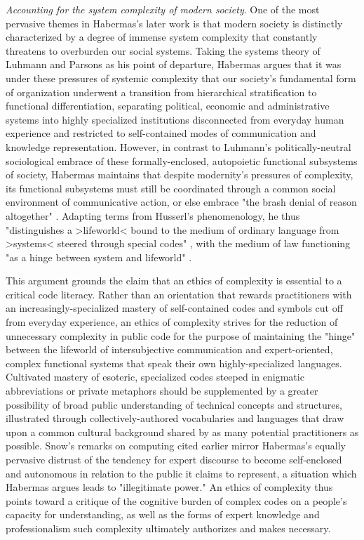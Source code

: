 \emph{Accounting for the system complexity of modern society}. One of the most pervasive themes in Habermas's later work is that modern society is distinctly characterized by a degree of immense system complexity that constantly threatens to overburden our social systems. Taking the systems theory of Luhmann and Parsons as his point of departure, Habermas argues that it was under these pressures of systemic complexity that our society's fundamental form of organization underwent a transition from hierarchical stratification to functional differentiation, separating political, economic and administrative systems into highly specialized institutions disconnected from everyday human experience and restricted to self-contained modes of communication and knowledge representation. However, in contrast to Luhmann's politically-neutral sociological embrace of these formally-enclosed, autopoietic functional subsystems of society, Habermas maintains that despite modernity's pressures of complexity, its functional subsystems must still be coordinated through a common social environment of communicative action, or else embrace "the brash denial of reason altogether" \autocite[3]{Habermas-bfn}. Adapting terms from Husserl's phenomenology, he thus "distinguishes a >lifeworld< bound to the medium of ordinary language from >systems< steered through special codes" \autocite[55]{Habermas-bfn}, with the medium of law functioning "as a hinge between system and lifeworld" \autocite[56]{Habermas-bfn}.

This argument grounds the claim that an ethics of complexity is essential to a critical code literacy. Rather than an orientation that rewards practitioners with an increasingly-specialized mastery of self-contained codes and symbols cut off from everyday experience, an ethics of complexity strives for the reduction of unnecessary complexity in public code for the purpose of maintaining the "hinge" between the lifeworld of intersubjective communication and expert-oriented, complex functional systems that speak their own highly-specialized languages. Cultivated mastery of esoteric, specialized codes steeped in enigmatic abbreviations or private metaphors should be supplemented by a greater possibility of broad public understanding of technical concepts and structures, illustrated through collectively-authored vocabularies and languages that draw upon a common cultural background shared by as many potential practitioners as possible. Snow's remarks on computing cited earlier mirror Habermas's equally pervasive distrust of the tendency for expert discourse to become self-enclosed and autonomous in relation to the public it claims to represent, a situation which Habermas argues leads to "illegitimate power." An ethics of complexity thus points toward a critique of the cognitive burden of complex codes on a people's capacity for understanding, as well as the forms of expert knowledge and professionalism such complexity ultimately authorizes and makes necessary.

